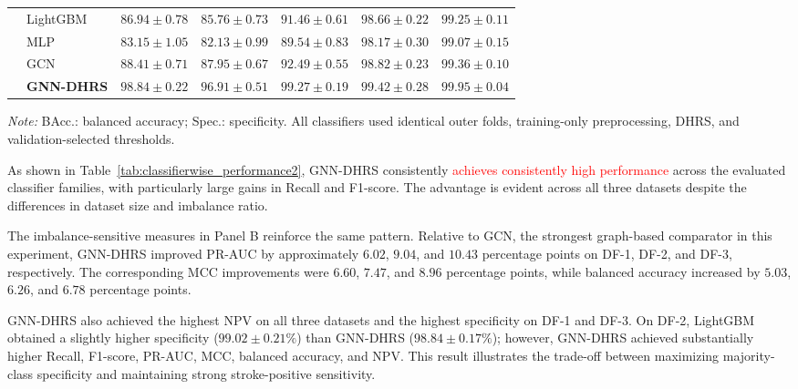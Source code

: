 \documentclass[pdflatex,sn-mathphys-num]{sn-jnl}%
\theoremstyle{thmstyleone}%
\theoremstyle{thmstyletwo}%
\theoremstyle{thmstylethree}%
\begin{document}
\begin{table}[!ht]
\begin{tabular}{@{}llccccc@{}}
& LightGBM
& $86.94\pm0.78$
& $85.76\pm0.73$
& $91.46\pm0.61$
& $98.66\pm0.22$
& $99.25\pm0.11$ \\

& MLP
& $83.15\pm1.05$
& $82.13\pm0.99$
& $89.54\pm0.83$
& $98.17\pm0.30$
& $99.07\pm0.15$ \\

& GCN
& $88.41\pm0.71$
& $87.95\pm0.67$
& $92.49\pm0.55$
& $98.82\pm0.23$
& $99.36\pm0.10$ \\

& \textbf{GNN-DHRS}
& \textbf{$98.84\pm0.22$}
& \textbf{$96.91\pm0.51$}
& \textbf{$99.27\pm0.19$}
& \textbf{$99.42\pm0.28$}
& \textbf{$99.95\pm0.04$} \\

\bottomrule
\end{tabular}

\endgroup

\vspace{1pt}

\begin{minipage}{0.98\textwidth}
\footnotesize
 {
\textit{Note:} BAcc.: balanced accuracy; Spec.: specificity. All classifiers
used identical outer folds, training-only preprocessing, DHRS, and
validation-selected thresholds.
}
\end{minipage}

\end{table}

As shown in Table~\ref{tab:classifierwise_performance2}, GNN-DHRS consistently
\textcolor{red}{
achieves consistently high performance
} across the evaluated classifier
families, with particularly large gains in Recall and F1-score. The advantage
is evident across all three datasets despite the differences in dataset size
and imbalance ratio.

 {
The imbalance-sensitive measures in Panel B reinforce the same pattern.
Relative to GCN, the strongest graph-based comparator in this experiment,
GNN-DHRS improved PR-AUC by approximately \(6.02\), \(9.04\), and
\(10.43\) percentage points on DF-1, DF-2, and DF-3, respectively. The
corresponding MCC improvements were \(6.60\), \(7.47\), and \(8.96\)
percentage points, while balanced accuracy increased by \(5.03\), \(6.26\),
and \(6.78\) percentage points.
}

 {
GNN-DHRS also achieved the highest NPV on all three datasets and the highest
specificity on DF-1 and DF-3. On DF-2, LightGBM obtained a slightly higher
specificity (\(99.02\pm0.21\%\)) than GNN-DHRS
(\(98.84\pm0.17\%\)); however, GNN-DHRS achieved substantially higher
Recall, F1-score, PR-AUC, MCC, balanced accuracy, and NPV. This result
illustrates the trade-off between maximizing majority-class specificity and
maintaining strong stroke-positive sensitivity.
}
\end{document}
